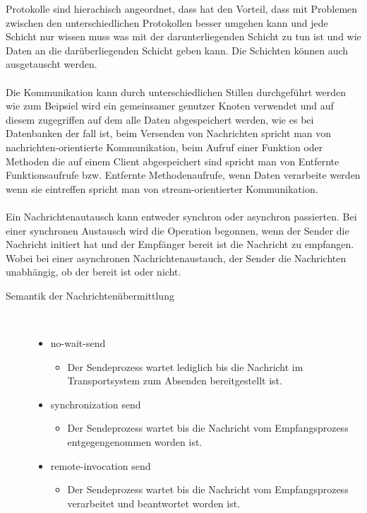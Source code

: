 \documentclass[a4paper,12pt]{article}
\begin{document}
Protokolle sind hierachisch angeordnet, dass hat den Vorteil, dass mit Problemen zwischen den unterschiedlichen Protokollen besser umgehen kann und jede Schicht nur wissen muss was mit der darunterliegenden Schicht zu tun ist und wie Daten an die darüberliegenden Schicht geben kann. Die Schichten können auch ausgetauscht werden.
\\\\
Die Kommunikation kann durch unterschiedlichen Stillen durchgeführt werden wie zum Beipsiel wird ein gemeinsamer genutzer Knoten verwendet und auf diesem zugegriffen auf dem alle Daten abgespeichert werden, wie es bei Datenbanken der fall ist, beim Versenden von Nachrichten spricht man von nachrichten-orientierte Kommunikation, beim Aufruf einer Funktion oder Methoden die auf einem Client abgespeichert sind
spricht man von Entfernte Funktionsaufrufe bzw. Entfernte Methodenaufrufe, wenn Daten verarbeite werden wenn sie eintreffen spricht man von stream-orientierter Kommunikation.\\\\
Ein Nachrichtenautausch kann entweder synchron oder asynchron passierten. Bei einer synchronen Austausch wird die Operation begonnen, wenn der Sender die Nachricht initiert hat und der Empfänger bereit ist die Nachricht zu empfangen. Wobei bei einer asynchronen Nachrichtenaustauch, der Sender die Nachrichten unabhängig, ob der bereit ist oder nicht. 
\begin{description}
    \item[Semantik der Nachrichtenübermittlung] ~\par
    \begin{itemize}
        \item no-wait-send
        \begin{itemize}
            \item{Der Sendeprozess wartet lediglich bis die Nachricht im Transportsystem zum Absenden bereitgestellt ist.}
        \end{itemize}
        \item synchronization send
        \begin{itemize}
            \item{Der Sendeprozess wartet bis die Nachricht vom Empfangsprozess entgegengenommen worden ist.}
        \end{itemize}
        \item remote-invocation send
        \begin{itemize}
            \item{Der Sendeprozess wartet bis die Nachricht vom Empfangsprozess verarbeitet und beantwortet worden ist.\\\\\\\\\\}
        \end{itemize}
    \end{itemize} 
\end{description}
\end{document}

